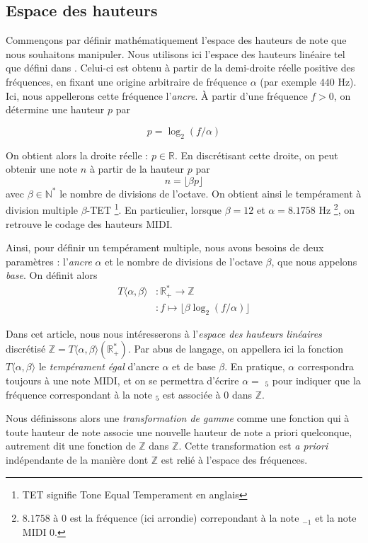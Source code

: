 \documentclass{article}
\begin{document}
\subsection{Espace des hauteurs}
Commençons par définir mathématiquement l'espace des hauteurs de note que nous souhaitons manipuler. Nous utilisons ici l'espace des hauteurs linéaire tel que défini dans \cite{morris1987composition}. Celui-ci est obtenu à partir de la demi-droite réelle positive des fréquences, en fixant une origine arbitraire de fréquence $\alpha$ (par exemple $440$ Hz). Ici, nous appellerons cette fréquence l'\emph{ancre}.  À partir d'une fréquence $f>0$, on détermine une hauteur $p$ par

$$p = \log_2(f/\alpha)$$

On obtient alors la droite réelle : $p\in \mathbb{R}$. En discrétisant cette droite, on peut obtenir une note $n$ à partir de la hauteur $p$ par 
$$n = \lfloor \beta p \rfloor$$
\noindent avec $\beta\in \mathbb{N}^*$ le nombre de divisions de l'octave. On obtient ainsi le tempérament à division multiple $\beta$-TET \footnote{TET signifie Tone Equal Temperament en anglais}. En particulier, lorsque $\beta = 12$ et $\alpha = 8.1758$ Hz \footnote{ $8.1758$ à $0$ est la fréquence (ici arrondie) correpondant à la note $_{-1}$ et la note MIDI $0$.}, on retrouve le codage des hauteurs MIDI.

Ainsi, pour définir un tempérament multiple, nous avons besoins de deux paramètres : l'\emph{ancre} $\alpha$  et le nombre de divisions de l'octave $\beta$, que nous appelons \emph{base}. On définit alors \begin{align*}
  T\langle \alpha, \beta \rangle &: \mathbb{R}_+^* \rightarrow \mathbb{Z}\\
  &:f \mapsto \lfloor \beta \log_2(f/\alpha)\rfloor
\end{align*}


Dans cet article, nous nous intéresserons à l'\emph{espace des hauteurs linéaires} discrétisé $\mathbb{Z} = T\langle\alpha, \beta \rangle (\mathbb{R^*_+})$. Par abus de langage, on appellera ici la fonction $T\langle \alpha, \beta \rangle$ le \emph{tempérament égal} d'ancre $\alpha$ et de base $\beta$. En pratique, $\alpha$ correspondra toujours à une note MIDI, et on se permettra d'écrire $\alpha =$ $_5$ pour indiquer que la fréquence correspondant à la note $_5$ est associée à $0$ dans $\mathbb{Z}$.

Nous définissons alors une \emph{transformation de gamme} comme une fonction qui à toute hauteur de note associe une nouvelle hauteur de note a priori quelconque, autrement dit une fonction de $\mathbb{Z}$ dans $\mathbb{Z}$. Cette transformation est \emph{a priori} indépendante de la manière dont $\mathbb{Z}$ est relié à l'espace des fréquences.
\end{document}

